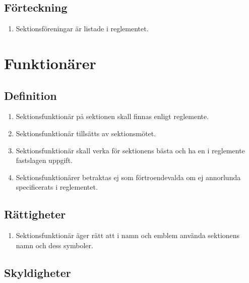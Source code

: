 \documentclass[11pt,a4paper]{article}
\begin{document}
\subsection{Förteckning}
\begin{enumerate}[\thesubsection.1]
    \item Sektionsföreningar är listade i reglementet.
\end{enumerate}

\newpage

\section{Funktionärer}

\subsection{Definition}

\begin{enumerate}[\thesubsection.1]

  \item Sektionsfunktionär på sektionen skall finnas enligt
  reglemente.

  \item Sektionsfunktionär tillsätts av sektionsmötet.

  \item Sektionsfunktionär skall verka för sektionens bästa och ha en
  i reglemente fastslagen uppgift.

  \item Sektionsfunktionärer betraktas ej som förtroendevalda om ej annorlunda specificerats i reglementet.

\end{enumerate}

\subsection{Rättigheter}

\begin{enumerate}[\thesubsection.1]

  \item Sektionsfunktionär äger rätt att i namn och emblem använda
  sektionens namn och dess symboler.

\end{enumerate}

\subsection{Skyldigheter}
\end{document}
